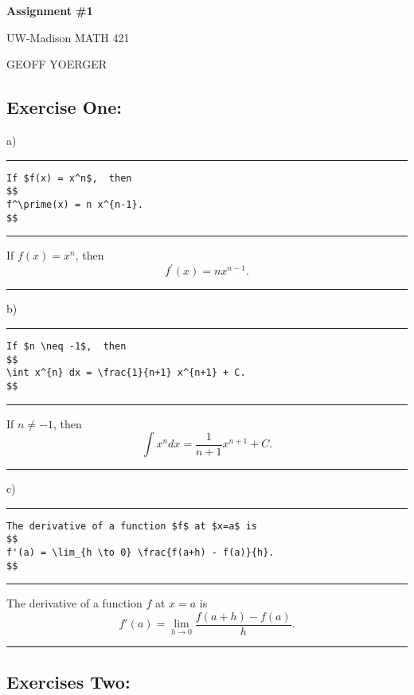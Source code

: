\documentclass{article} %
\newcommand{\linediv}{\noindent\rule{6.5in}{2pt}}
\newcommand{\linedivm}{\noindent\rule{6.5in}{1pt}}
\begin{document}
\begin{center}
    \Large{
        \textbf{Assignment \#1}

        UW-Madison MATH 421
    }
    
    \vspace{5pt}
        
    \normalsize{
        GEOFF YOERGER

        \usdate
    }
    
    \vspace{15pt}
\end{center}
    
\subsection*{Exercise One:} 
    
a)

\linediv

\begin{verbatim}
If $f(x) = x^n$,  then 
$$
f^\prime(x) = n x^{n-1}.
$$
\end{verbatim}

\linedivm

If $f(x) = x^n$,  then 
$$
f^\prime(x) = n x^{n-1}.
$$

\linediv
 
\noindent b)

\linediv

\begin{verbatim}
If $n \neq -1$,  then 
$$
\int x^{n} dx = \frac{1}{n+1} x^{n+1} + C.
$$
\end{verbatim}

\linedivm

If $n \neq -1$,  then 
$$
\int x^{n} dx = \frac{1}{n+1} x^{n+1} + C.
$$

\linediv

\noindent c)

\linediv

\begin{verbatim}
The derivative of a function $f$ at $x=a$ is
$$
f'(a) = \lim_{h \to 0} \frac{f(a+h) - f(a)}{h}.
$$
\end{verbatim}

\linedivm

The derivative of a function $f$ at $x=a$ is
$$
f'(a) = \lim_{h \to 0} \frac{f(a+h) - f(a)}{h}.
$$

\linediv

    
\subsection*{Exercises Two:}     
    
\end{document}
